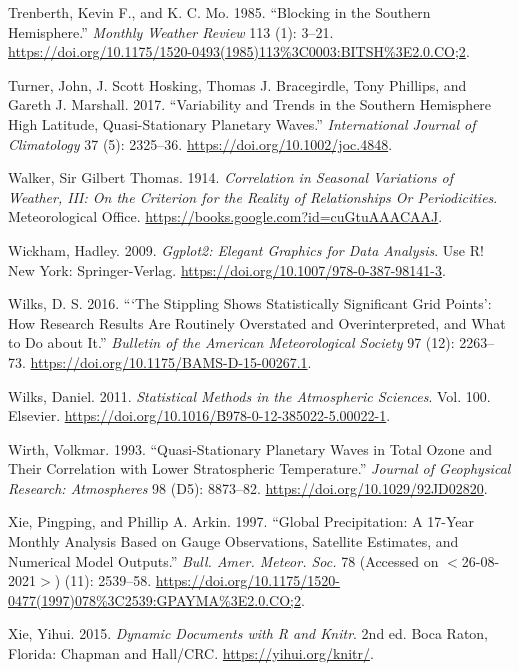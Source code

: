 \documentclass[smallextended]{svjour3}       %
\newlength{\cslhangindent}
\newlength{\cslentryspacingunit} %
\newenvironment{CSLReferences}[2] %
 {%
  \setlength{\parindent}{0pt}
  \ifodd #1
  \let\oldpar\par
  \def\par{\hangindent=\cslhangindent\oldpar}
  \fi
  \setlength{\parskip}{#2\cslentryspacingunit}
 }%
 {}
\begin{document}
\begin{CSLReferences}{1}{0}
\leavevmode{}%
Trenberth, Kevin F., and K. C. Mo. 1985. {``Blocking in the {Southern Hemisphere}.''} \emph{Monthly Weather Review} 113 (1): 3--21. \url{https://doi.org/10.1175/1520-0493(1985)113\%3C0003:BITSH\%3E2.0.CO;2}.

\leavevmode{}%
Turner, John, J. Scott Hosking, Thomas J. Bracegirdle, Tony Phillips, and Gareth J. Marshall. 2017. {``Variability and Trends in the {Southern Hemisphere} High Latitude, Quasi-Stationary Planetary Waves.''} \emph{International Journal of Climatology} 37 (5): 2325--36. \url{https://doi.org/10.1002/joc.4848}.

\leavevmode{}%
Walker, Sir Gilbert Thomas. 1914. \emph{Correlation in {Seasonal Variations} of {Weather}, {III}: {On} the {Criterion} for the {Reality} of {Relationships Or Periodicities}}. {Meteorological Office}. \url{https://books.google.com?id=cuGtuAAACAAJ}.

\leavevmode{}%
Wickham, Hadley. 2009. \emph{Ggplot2: {Elegant Graphics} for {Data Analysis}}. Use {R}! {New York}: {Springer-Verlag}. \url{https://doi.org/10.1007/978-0-387-98141-3}.

\leavevmode{}%
Wilks, D. S. 2016. {``{`{The Stippling Shows Statistically Significant Grid Points}'}: {How Research Results} Are {Routinely Overstated} and {Overinterpreted}, and {What} to {Do} about {It}.''} \emph{Bulletin of the American Meteorological Society} 97 (12): 2263--73. \url{https://doi.org/10.1175/BAMS-D-15-00267.1}.

\leavevmode{}%
Wilks, Daniel. 2011. \emph{Statistical {Methods} in the {Atmospheric Sciences}}. Vol. 100. {Elsevier}. \url{https://doi.org/10.1016/B978-0-12-385022-5.00022-1}.

\leavevmode{}%
Wirth, Volkmar. 1993. {``Quasi-Stationary Planetary Waves in Total Ozone and Their Correlation with Lower Stratospheric Temperature.''} \emph{Journal of Geophysical Research: Atmospheres} 98 (D5): 8873--82. \url{https://doi.org/10.1029/92JD02820}.

\leavevmode{}%
Xie, Pingping, and Phillip A. Arkin. 1997. {``Global {Precipitation}: {A} 17-{Year Monthly Analysis Based} on {Gauge Observations}, {Satellite Estimates}, and {Numerical Model Outputs}.''} \emph{Bull. Amer. Meteor. Soc.} 78 (Accessed on {\(<\)}26-08-2021{\(>\)}) (11): 2539--58. \url{https://doi.org/10.1175/1520-0477(1997)078\%3C2539:GPAYMA\%3E2.0.CO;2}.

\leavevmode{}%
Xie, Yihui. 2015. \emph{Dynamic Documents with {R} and Knitr}. 2nd ed. {Boca Raton, Florida}: {Chapman and Hall/CRC}. \url{https://yihui.org/knitr/}.

\end{CSLReferences}




\end{document}
